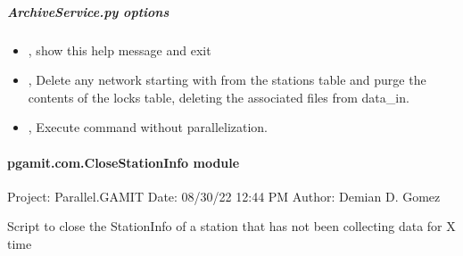 \documentclass[letterpaper,10pt,english]{sphinxmanual}
\begin{document}
\subparagraph{ArchiveService.py options}
\label{\detokenize{pgamit.com:ArchiveService.py-options}}\begin{itemize}
\item {} 
\sphinxAtStartPar
{\hyperref[\detokenize{pgamit.com:ArchiveService.py--h}]{}}, {\hyperref[\detokenize{pgamit.com:ArchiveService.py---help}]{}} \sphinxhyphen{} show this help message and exit

\item {} 
\sphinxAtStartPar
{\hyperref[\detokenize{pgamit.com:ArchiveService.py--purge}]{}}, {\hyperref[\detokenize{pgamit.com:ArchiveService.py---purge_locks}]{}} \sphinxhyphen{} Delete any network starting with  from the stations table and purge the contents of the locks table, deleting the associated files from data\_in.

\item {} 
\sphinxAtStartPar
{\hyperref[\detokenize{pgamit.com:ArchiveService.py--np}]{}}, {\hyperref[\detokenize{pgamit.com:ArchiveService.py---noparallel}]{}} \sphinxhyphen{} Execute command without parallelization.

\end{itemize}


\paragraph{pgamit.com.CloseStationInfo module}
\label{\detokenize{pgamit.com:module-pgamit.com.CloseStationInfo}}\label{\detokenize{pgamit.com:pgamit-com-closestationinfo-module}}
\sphinxAtStartPar
Project: Parallel.GAMIT
Date: 08/30/22 12:44 PM
Author: Demian D. Gomez

\sphinxAtStartPar
Script to close the StationInfo of a station that has not been collecting data for X time
\end{document}
